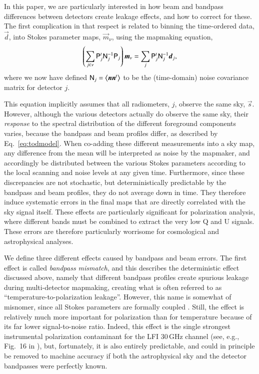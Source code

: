\documentclass[twocolumn]{aa}
\renewcommand{\d}[0]{\vec{d}}
\newcommand{\n}[0]{\vec{n}}
\newcommand{\s}[0]{\vec{s}}
\newcommand{\m}[0]{\vec{m}}
\newcommand{\N}[0]{\tens{N}}
\renewcommand{\P}[0]{\tens{P}}
\newcommand{\?}[1]{\textcolor{red}{{\bf [#1]}}}
\begin{document}
In this paper, we are particularly interested in how beam and bandpass
differences between detectors create leakage effects, and how to correct for
these. The first complication in that respect is related to binning the
time-ordered data, $\d$, into Stokes parameter maps, $\m_\nu$, using the mapmaking
equation,
\begin{equation}
  \left(\sum_{j \in \nu} \P_j^t \N_{j}^{-1} \P_j\right) \m_{\nu} =
  \sum_j \P_j^t \N_j^{-1}\d_j,
  \label{eq:binmap}
  \end{equation}
where we now have defined $\N_j=\left<\n\n^t\right>$ to be the
(time-domain) noise covariance matrix for detector $j$. 

This equation implicitly assumes that all radiometers, $j$, observe the same
sky, $\s$. However, although the various detectors actually do observe the same
sky, their \emph{response} to the spectral distribution of the different
foreground components varies, because the bandpass and beam profiles differ, as
described by Eq.~\eqref{eq:todmodel}. When co-adding these different
measurements into a sky map, any difference from the mean will be interpreted as
noise by the mapmaker, and accordingly be distributed between the various Stokes
parameters according to the local scanning and noise levels at any given time.
Furthermore, since these discrepancies are not stochastic, but deterministically
predictable by the bandpass and beam profiles, they do not average down in time.
They therefore induce systematic errors in the final maps that are directly
correlated with the sky signal itself. These effects are particularly
significant for polarization analysis, where different bands must be combined to
extract the very low Q and U signals. These errors are therefore particularly
worrisome for cosmological and astrophysical analyses.

We define three different effects caused by bandpass and beam
errors. The first effect is called \textit{bandpass mismatch}, and
this describes the deterministic effect discussed above, namely that
different bandpass profiles create spurious leakage during
multi-detector mapmaking, creating what is often referred to as
``temperature-to-polarization leakage''. However, this name is
somewhat of misnomer, since all Stokes parameters are formally coupled
\citep[see, e.g.,][]{npipe}.  Still, the effect is relatively much
more important for polarization than for temperature because of its
far lower signal-to-noise ratio. Indeed, this effect is the single
strongest instrumental polarization contaminant for the LFI 30\,GHz
channel (see, e.g., Fig.~16 in \citealp{bp01}), but, fortunately, it
is also entirely predictable, and could in principle be removed to machine
accuracy if both the astrophysical sky and the detector bandpasses
were perfectly known.
\end{document}
